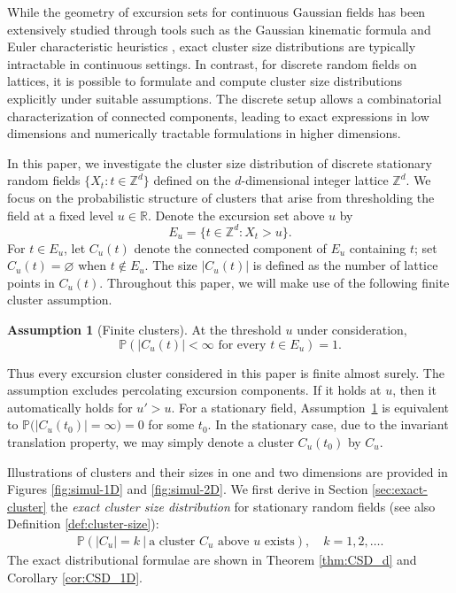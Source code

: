 \documentclass[aap,preprint]{imsart}
\theoremstyle{plain}
\theoremstyle{definition}
\newtheorem{assumption}[theorem]{Assumption}
\def\R{{\mathbb R}}
\def\P{{\mathbb P}}
\def\Z{{\mathbb Z}}
\begin{document}
	While the geometry of excursion sets for continuous Gaussian fields has been extensively studied through tools such as the Gaussian kinematic formula and Euler characteristic heuristics \cite{AT07,Taylor:2007}, exact cluster size distributions are typically intractable in continuous settings. In contrast, for discrete random fields on lattices, it is possible to formulate and compute cluster size distributions explicitly under suitable assumptions. The discrete setup allows a combinatorial characterization of connected components, leading to exact expressions in low dimensions and numerically tractable formulations in higher dimensions.
	
	In this paper, we investigate the cluster size distribution of discrete stationary random fields $\{X_t: t\in \Z^d\}$ defined on the $d$-dimensional integer lattice $\Z^d$. We focus on the probabilistic structure of clusters that arise from thresholding the field at a fixed level $u\in \R$. Denote the excursion set above $u$ by
	\[
	E_u=\{t\in\mathbb Z^d:X_t>u\}.
	\]
	For $t\in E_u$, let \(C_u(t)\) denote the connected component
	of \(E_u\) containing \(t\); set \(C_u(t)=\varnothing\) when
	\(t\notin E_u\). The size $|C_u(t)|$ is defined as the number of lattice points in $C_u(t)$. Throughout this paper, we will make use of the following finite cluster assumption.
	
	\begin{assumption}[Finite clusters]\label{ass:finite-cluster}
		At the threshold $u$ under consideration,
		\begin{equation*}
			\mathbb P\left(
			|C_u(t)|<\infty \text{ for every }t\in E_u
			\right)=1.
		\end{equation*}
	\end{assumption}

	Thus every excursion cluster considered in this paper is finite
	almost surely. The assumption excludes percolating excursion components. If it holds at $u$, then it automatically holds for $u'>u$. For a stationary field, Assumption~\ref{ass:finite-cluster}
	is equivalent to $\mathbb P\bigl(|C_u(t_0)|=\infty\bigr)=0$ for some $t_0$. In the stationary case, due to the invariant translation property, we may simply denote a cluster $C_u(t_0)$ by $C_u$.
	
	Illustrations of clusters and their sizes in one and two dimensions are provided in Figures \ref{fig:simul-1D} and \ref{fig:simul-2D}. We first derive in Section \ref{sec:exact-cluster} the \emph{exact cluster size distribution} for stationary random fields (see also Definition \ref{def:cluster-size}):
	\begin{equation*}
		\begin{split}
			\P( |C_u|=k \ | \ \text{a cluster $C_u$ above $u$ exists}), \quad k=1,2,\ldots.
		\end{split}
	\end{equation*}
	The exact distributional formulae are shown in Theorem \ref{thm:CSD_d} and Corollary \ref{cor:CSD_1D}.
	
\end{document}
